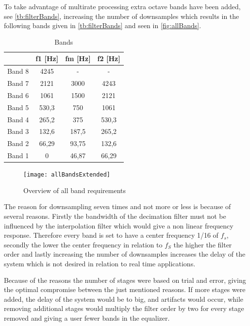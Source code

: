 To take advantage of multirate processing extra octave bands have been added, see \autoref{tb:filterBands}, increasing the number of downsamples which results in the following bands given in \autoref{tb:filterBands} and seen in \autoref{fig:allBands}.
\begin{table}[H]
\centering
\begin{tabular}{|c|c|c|c|}
\hline
       & f1 {[}Hz{]} & fm {[}Hz{]} & f2 {[}Hz{]} \\ \hline
Band 8 & 4245        & -           & -       	 \\ \hline
Band 7 & 2121        & 3000        & 4243        \\ \hline
Band 6 & 1061        & 1500        & 2121        \\ \hline
Band 5 & 530,3       & 750         & 1061        \\ \hline
Band 4 & 265,2       & 375         & 530,3       \\ \hline
Band 3 & 132,6       & 187,5       & 265,2       \\ \hline
Band 2 & 66,29       & 93,75       & 132,6       \\ \hline
Band 1 & 0     		 & 46,87       & 66,29       \\ \hline
\end{tabular}
\caption{Bands}
\label{tb:filterBands}
\end{table}   

\begin{figure}[H]
	\centering
	\texttt{[image: allBandsExtended]}
	\caption{Overview of all band requirements}
	\label{fig:allBands}
\end{figure}
The reason for downsampling seven times and not more or less is because of several reasons. Firstly the bandwidth of the decimation filter must not be influenced by the interpolation filter which would give a non linear frequency response. Therefore every band is set to have a center frequency 1/16 of $f_s$, secondly the lower the center frequency in relation to $f_S$ the higher the filter order and lastly increasing the number of downsamples increases the delay of the system which is not desired in relation to real time applications.      

Because of the reasons the number of stages were based on trial and error, giving the optimal compromise between the just mentioned reasons. If more stages were added, the delay of the system would be to big, and artifacts would occur, while removing additional stages would multiply the filter order by two for every stage removed and giving a user fewer bands in the equalizer.    

